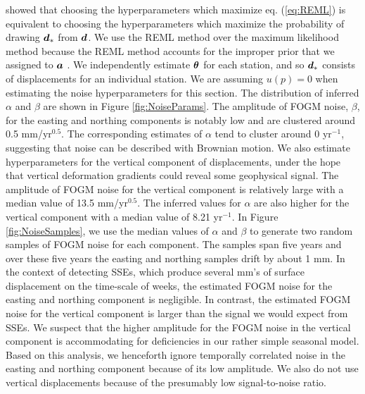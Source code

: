 \documentclass[extra,mreferee]{gji}
\begin{document}
\citet{Harville1974} showed that choosing the hyperparameters which maximize eq. (\ref{eq:REML}) is equivalent to choosing the hyperparameters which maximize the probability of drawing $\mitbf{d}_*$ from $\mitbf{d}$. We use the REML method over the maximum likelihood method \citep[e.g.,][]{Langbein1997} because the REML method accounts for the improper prior that we assigned to $\mitbf{a}$ \citep{Hines2017}. We independently estimate $\mitbf{\theta}$ for each station, and so $\mitbf{d}_*$ consists of displacements for an individual station. We are assuming $u(p)=0$ when estimating the noise hyperparameters for this section. The distribution of inferred $\alpha$ and $\beta$ are shown in Figure \ref{fig:NoiseParams}. The amplitude of FOGM noise, $\beta$, for the easting and northing components is notably low and are clustered around 0.5 mm/yr$^{0.5}$. The corresponding estimates of $\alpha$ tend to cluster around 0 yr$^{-1}$, suggesting that noise can be described with Brownian motion. We also estimate hyperparameters for the vertical component of displacements, under the hope that vertical deformation gradients could reveal some geophysical signal. The amplitude of FOGM noise for the vertical component is relatively large with a median value of 13.5 mm/yr$^{0.5}$.  The inferred values for $\alpha$ are also higher for the vertical component with a median value of 8.21 yr$^{-1}$. In Figure \ref{fig:NoiseSamples}, we use the median values of $\alpha$ and $\beta$ to generate two random samples of FOGM noise for each component. The samples span five years and over these five years the easting and northing samples drift by about 1 mm. In the context of detecting SSEs, which produce several mm's of surface displacement on the time-scale of weeks, the estimated FOGM noise for the easting and northing component is negligible. In contrast, the estimated FOGM noise for the vertical component is larger than the signal we would expect from SSEs. We suspect that the higher amplitude for the FOGM noise in the vertical component is accommodating for deficiencies in our rather simple seasonal model. Based on this analysis, we henceforth ignore temporally correlated noise in the easting and northing component because of its low amplitude. We also do not use vertical displacements because of the presumably low signal-to-noise ratio.
\end{document}

